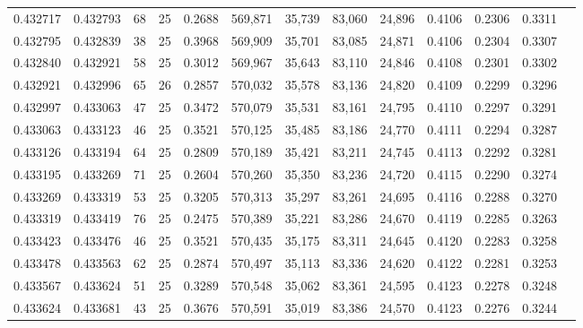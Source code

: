 \begin{tabular}{rrrrrrrrrrrrr}
0.432717 & 0.432793 &    68 &  25 &                                     0.2688 & 569,871 &  35,739 &  83,060 &  24,896 & 0.4106 & 0.2306 & 0.3311 \\
0.432795 & 0.432839 &    38 &  25 &                                     0.3968 & 569,909 &  35,701 &  83,085 &  24,871 & 0.4106 & 0.2304 & 0.3307 \\
0.432840 & 0.432921 &    58 &  25 &                                     0.3012 & 569,967 &  35,643 &  83,110 &  24,846 & 0.4108 & 0.2301 & 0.3302 \\
0.432921 & 0.432996 &    65 &  26 &                                     0.2857 & 570,032 &  35,578 &  83,136 &  24,820 & 0.4109 & 0.2299 & 0.3296 \\
0.432997 & 0.433063 &    47 &  25 &                                     0.3472 & 570,079 &  35,531 &  83,161 &  24,795 & 0.4110 & 0.2297 & 0.3291 \\
0.433063 & 0.433123 &    46 &  25 &                                     0.3521 & 570,125 &  35,485 &  83,186 &  24,770 & 0.4111 & 0.2294 & 0.3287 \\
0.433126 & 0.433194 &    64 &  25 &                                     0.2809 & 570,189 &  35,421 &  83,211 &  24,745 & 0.4113 & 0.2292 & 0.3281 \\
0.433195 & 0.433269 &    71 &  25 &                                     0.2604 & 570,260 &  35,350 &  83,236 &  24,720 & 0.4115 & 0.2290 & 0.3274 \\
0.433269 & 0.433319 &    53 &  25 &                                     0.3205 & 570,313 &  35,297 &  83,261 &  24,695 & 0.4116 & 0.2288 & 0.3270 \\
0.433319 & 0.433419 &    76 &  25 &                                     0.2475 & 570,389 &  35,221 &  83,286 &  24,670 & 0.4119 & 0.2285 & 0.3263 \\
0.433423 & 0.433476 &    46 &  25 &                                     0.3521 & 570,435 &  35,175 &  83,311 &  24,645 & 0.4120 & 0.2283 & 0.3258 \\
0.433478 & 0.433563 &    62 &  25 &                                     0.2874 & 570,497 &  35,113 &  83,336 &  24,620 & 0.4122 & 0.2281 & 0.3253 \\
0.433567 & 0.433624 &    51 &  25 &                                     0.3289 & 570,548 &  35,062 &  83,361 &  24,595 & 0.4123 & 0.2278 & 0.3248 \\
0.433624 & 0.433681 &    43 &  25 &                                     0.3676 & 570,591 &  35,019 &  83,386 &  24,570 & 0.4123 & 0.2276 & 0.3244 \\

\end{tabular}
